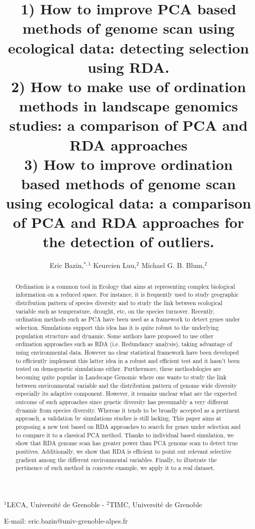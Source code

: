 \documentclass[a4paper,times,10pt,authoryear]{article}%
\begin{document}
\title{1) How to improve PCA based methods of genome scan using ecological data: detecting selection using RDA. \\ 2) How to make use of ordination methods in landscape genomics studies: a comparison of PCA and RDA approaches \\  3) How to improve ordination based methods of genome scan using ecological data: a comparison of PCA and RDA approaches for the detection of outliers.}

\maketitle


\author{Eric Bazin,$^{\ast,1}$ Keurcien Luu,$^{2}$ Michael G. B.
Blum,$^{2}$}

$^{1}$LECA, Universit\'{e} de Grenoble - $^{2}$TIMC, Universit\'{e} de Grenoble

E-mail: eric.bazin@univ-grenoble-alpes.fr



\begin{abstract}
Ordination is a common tool in Ecology that aims at representing complex biological information on a reduced space. For instance, it is frequently used to study geographic distribution pattern of species diversity and to study the link between ecological variable such as temperature, drought, etc, on the species turnover. 
Recently, ordination methods such as PCA have been used as a framework to detect genes under selection. Simulations support this idea has it is quite robust to the underlying population structure and dynamic. Some authors have proposed to use other ordination approaches  such as RDA (i.e. Redundancy analysis), taking advantage of using environmental data. However no clear statistical framework have been developed to efficiently implement this latter idea in a robust and efficient test and it hasn't been tested on demogenetic simulations either.
Furthermore, these methodologies are becoming quite popular in Landscape Genomic where one wants to study the link between environmental variable and the distribution pattern of genome wide diversity especially its adaptive component. However, it remains unclear what are the expected outcome of such approaches since genetic diversity has presumably a very different dynamic from species diversity. Whereas it tends to be broadly accepted as a pertinent approach, a validation by simulations studies is still lacking. 
This paper aims at proposing a new test based on RDA approaches to search for genes under selection and to compare it to a classical PCA method. Thanks to individual based simulation, we show that RDA genome scan has greater power than PCA genome scan to detect true positives. Additionally, we show that RDA is efficient to point out relevant selective gradient among the different environmental variables. Finally, to illustrate the pertinence of such method in concrete example, we apply it to a real dataset.
\end{abstract}
\end{document}
